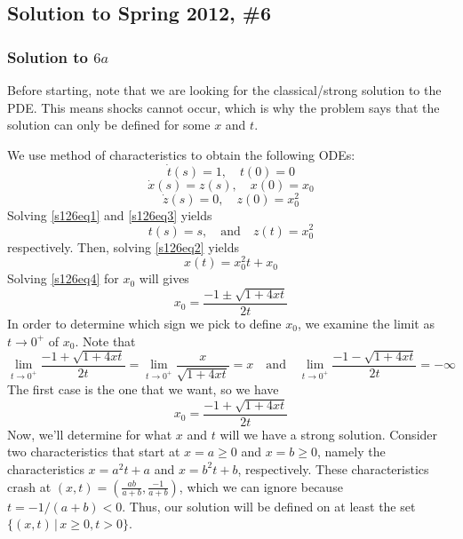 \subsection*{Solution to Spring 2012, \#6}\label{s126}

\subsubsection*{Solution to $6a$}

Before starting, note that we are looking for the classical/strong solution to the PDE. This means shocks cannot occur, which is why the problem says that the solution can only be defined for some $x$ and $t$.

\vspace{0.4cm}

We use method of characteristics to obtain the following ODEs:
\begin{equation}
	\label{s126eq1} \dot{t}(s) = 1, \quad t(0) = 0
\end{equation}
\begin{equation}
	\label{s126eq2} \dot{x}(s) = z(s), \quad x(0) = x_0
\end{equation}
\begin{equation}
	\label{s126eq3} \dot{z}(s) = 0, \quad z(0) = x_0^2
\end{equation}
Solving \eqref{s126eq1} and \eqref{s126eq3} yields
$$ t(s) = s, \quad \text{and} \quad z(t) = x_0^2 $$
respectively. Then, solving \eqref{s126eq2} yields
\begin{equation}
	\label{s126eq4} x(t) = x_0^2 t + x_0
\end{equation}
Solving \eqref{s126eq4} for $x_0$ will gives
$$ x_0 = \frac{-1 \pm \sqrt{1+4xt}}{2t} $$
In order to determine which sign we pick to define $x_0$, we examine the limit as $t \to 0^+$ of $x_0$. Note that
$$ \lim_{t \to 0^+}  \frac{-1 + \sqrt{1+4xt}}{2t} = \lim_{t \to 0^+} \frac{x}{\sqrt{1+4xt}} = x \quad \text{and} \quad \lim_{t \to 0^+} \frac{-1 - \sqrt{1+4xt}}{2t} = -\infty $$
The first case is the one that we want, so we have
$$ x_0 = \frac{-1 + \sqrt{1+4xt}}{2t} $$
Now, we'll determine for what $x$ and $t$ will we have a strong solution. Consider two characteristics that start at $x=a \geq 0$ and $x=b \geq 0$, namely the characteristics $x = a^2 t + a$ and $ x = b^2 t + b$, respectively. These characteristics crash at $(x,t) = \left( \frac{ab}{a+b}, \frac{-1}{a+b} \right)$, which we can ignore because $t = -1/(a+b) < 0$. Thus, our solution will be defined on at least the set $\{(x,t) \, | \, x \geq 0, t > 0 \}$.

